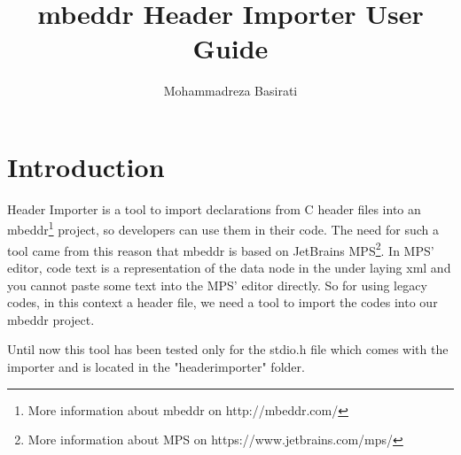 \documentclass{article}
\begin{document}
\title{mbeddr Header Importer User Guide}
\author{Mohammadreza Basirati}
\maketitle

\section{Introduction}
Header Importer is a tool to import declarations from C header files into an mbeddr\footnote{More information about mbeddr on http://mbeddr.com/} project, so developers can use them in their code.
The need for such a tool came from this reason that mbeddr is based on JetBrains MPS\footnote{More information about MPS on https://www.jetbrains.com/mps/}. In MPS' editor, code text is a representation of the data node in the under laying xml and you cannot paste some text into the MPS' editor directly. So for using legacy codes, in this context a header file, we need a tool to import the codes into our mbeddr project.

Until now this tool has been tested only for the stdio.h file which comes with the importer and is located in the "headerimporter" folder.
\end{document}
